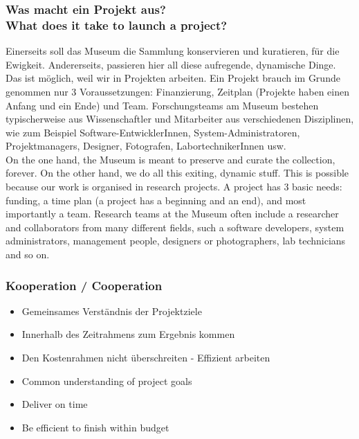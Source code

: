{\scriptsize
\begin{frame}
  \frametitle{Was macht ein Projekt aus? \\ \textcolor{mfn_green}{What does it take to launch a project?}}
  Einerseits soll das Museum die Sammlung konservieren und kuratieren, für die Ewigkeit. Andererseits, passieren hier all diese aufregende, dynamische Dinge. Das ist möglich, weil wir in Projekten arbeiten. Ein Projekt brauch im Grunde genommen nur 3 Voraussetzungen: Finanzierung, Zeitplan (Projekte haben einen Anfang und ein Ende) und Team. Forschungsteams am Museum bestehen typischerweise aus Wissenschaftler und Mitarbeiter aus verschiedenen Disziplinen, wie zum Beispiel Software-EntwicklerInnen, System-Administratoren, Projektmanagers, Designer, Fotografen, LabortechnikerInnen usw.\\
  \bigskip
  \textcolor{mfn_green}{On the one hand, the Museum is meant to preserve and curate the collection, forever. On the other hand, we do all this exiting, dynamic stuff. This is possible because our work is organised in research projects. A project has 3 basic needs: funding, a time plan (a project has a beginning and an end), and most importantly a team. Research teams at the Museum often include a researcher and collaborators from many different fields, such a software developers, system administrators, management people, designers or photographers, lab technicians and so on.}
\end{frame}
}
\begin{frame}
  \frametitle{Kooperation / \textcolor{mfn_green}{Cooperation}}

  \begin{itemize}
  \item{Gemeinsames Verständnis der Projektziele}
  \item{Innerhalb des Zeitrahmens zum Ergebnis kommen}
  \item{Den Kostenrahmen nicht überschreiten - Effizient arbeiten}
  \end{itemize}
  
  \begin{itemize}
  \item{\textcolor{mfn_green}{Common understanding of project goals}}
  \item{\textcolor{mfn_green}{Deliver on time}}
  \item{\textcolor{mfn_green}{Be efficient to finish within budget}}
  \end{itemize}
\end{frame}

